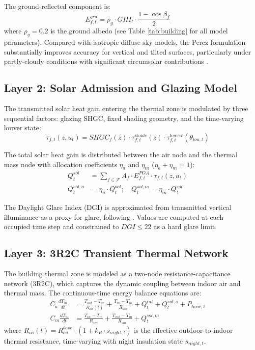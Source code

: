 \documentclass[preprint,12pt]{elsarticle}
\begin{document}
The ground-reflected component is:
\begin{equation}
\label{eq:ground}
E^{grd}_{f,t} = \rho_g \cdot GHI_t \cdot \frac{1 - \cos\beta_f}{2}
\end{equation}
where $\rho_g = 0.2$ is the ground albedo (see Table \ref{tab:building} for all model parameters). Compared with isotropic diffuse-sky models, the Perez formulation substantially improves accuracy for vertical and tilted surfaces, particularly under partly-cloudy conditions with significant circumsolar contributions \cite{perez1990}.

\subsection{Layer 2: Solar Admission and Glazing Model}

The transmitted solar heat gain entering the thermal zone is modulated by three sequential factors: glazing SHGC, fixed shading geometry, and the time-varying louver state:
\begin{equation}
\label{eq:tau}
\tau_{f,t}(z, u_t) = SHGC_f(z) \cdot \tau^{shade}_{f,t}(z) \cdot \tau^{louver}_{f,t}(\theta_{lou,t})
\end{equation}

The total solar heat gain is distributed between the air node and the thermal mass node with allocation coefficients $\eta_a$ and $\eta_m$ ($\eta_a + \eta_m = 1$):
\begin{align}
\label{eq:qsol}
Q^{sol}_t &= \sum_{f \in \mathcal{F}} A_f \cdot E^{POA}_{f,t} \cdot \tau_{f,t}(z, u_t) \\
\label{eq:qsol-dist}
Q^{sol,a}_t &= \eta_a \cdot Q^{sol}_t; \quad Q^{sol,m}_t = \eta_m \cdot Q^{sol}_t
\end{align}

The Daylight Glare Index (DGI) is approximated from transmitted vertical illuminance as a proxy for glare, following \cite{wienold2006}. Values are computed at each occupied time step and constrained to $DGI \leq 22$ as a hard glare limit.

\subsection{Layer 3: 3R2C Transient Thermal Network}

The building thermal zone is modeled as a two-node resistance-capacitance network (3R2C), which captures the dynamic coupling between indoor air and thermal mass. The continuous-time energy balance equations are:
\begin{align}
\label{eq:3r2c-a}
C_a \frac{dT_{in}}{dt} &= \frac{T_{out} - T_{in}}{R_{oa}(t)} + \frac{T_m - T_{in}}{R_{am}} + Q^{int}_t + Q^{sol,a}_t + P_{hvac,t} \\
\label{eq:3r2c-m}
C_m \frac{dT_m}{dt} &= \frac{T_{in} - T_m}{R_{am}} + \frac{T_{out} - T_m}{R_{om}} + Q^{sol,m}_t
\end{align}
where $R_{oa}(t) = R_{oa}^{base} \cdot (1 + k_R \cdot s_{night,t})$ is the effective outdoor-to-indoor thermal resistance, time-varying with night insulation state $s_{night,t}$.
\end{document}
